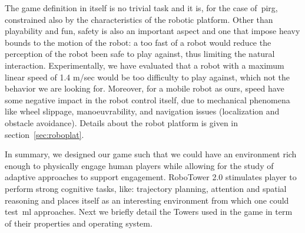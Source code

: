 The game definition in itself is no trivial task and it is, for the case of~\gls{pirg}, constrained also by the characteristics of the robotic platform. Other than playability and fun, safety is also an important aspect and one that impose heavy bounds to the motion of the robot: a too fast of a robot would reduce the perception of the robot been safe to play against, thus limiting the natural interaction. Experimentally, we have evaluated that a robot with a maximum linear speed of 1.4 m/sec would be too difficulty to play against, which not the behavior we are looking for. Moreover, for a mobile robot as ours, speed have some negative impact in the robot control itself, due to mechanical phenomena like wheel slippage, manoeuvrability, and navigation issues (localization and obstacle avoidance). Details about the robot platform is given in section~\ref{sec:roboplat}.

In summary, we designed our game such that we could have an environment rich enough to physically engage human players while allowing for the study of adaptive approaches to support engagement. RoboTower 2.0 stimulates player to perform strong cognitive tasks, like: trajectory planning, attention and spatial reasoning and places itself as an interesting environment from which one could test~\gls{ml} approaches. Next we briefly detail the Towers used in the game in term of their properties and operating system.

